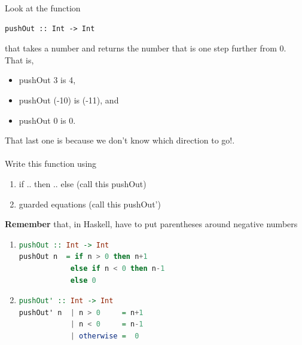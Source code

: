 \documentclass{article}
\begin{document}
\begin{Exercise}
 Look at the function 
  \begin{lstlisting}
pushOut :: Int -> Int
  \end{lstlisting}   

  that takes a number and returns the number that is one step further from 0. 
  That is, 
  \begin{itemize}
    \item pushOut 3 is 4, 
    \item pushOut (-10) is (-11), and
    \item pushOut 0 is 0.
  \end{itemize}

That last one is because we don’t know which direction to go!.\\ \\


Write this function using 
\begin{enumerate}
  \item if .. then .. else  (call this pushOut)
  \item guarded equations    (call this pushOut')
\end{enumerate}
 
  \textbf{Remember} that, in Haskell, have to put parentheses around negative numbers
  \end{Exercise}

  \begin{Answer}
    \begin{enumerate}
      \item
      \begin{lstlisting}[language=Haskell]
pushOut :: Int -> Int
pushOut n  = if n > 0 then n+1 
            else if n < 0 then n-1
            else 0
          \end{lstlisting}

      \item  
      \begin{lstlisting}[language=Haskell]
pushOut' :: Int -> Int
pushOut' n  | n > 0     = n+1 
            | n < 0     = n-1
            | otherwise =  0
          \end{lstlisting}
    \end{enumerate}
   
    \end{Answer}
\end{document}
